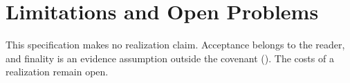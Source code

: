 \documentclass[../main.tex]{subfiles}
\begin{document}
\section{Limitations and Open Problems}
\label{sec:kpc:limitations}
This specification makes no realization claim. Acceptance belongs to the
reader, and finality is an evidence assumption outside the covenant
(). The costs of a realization remain open.
\end{document}
